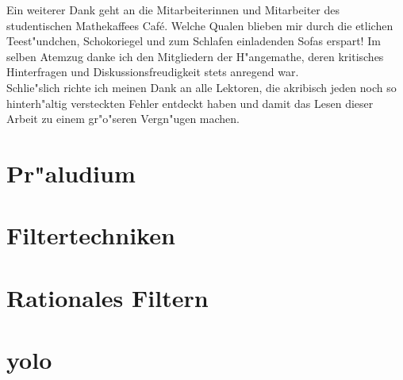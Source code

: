 \documentclass[11pt, twoside]{report} %
\begin{document}
Ein weiterer Dank geht an die Mitarbeiterinnen und Mitarbeiter des studentischen Mathekaffees  Caf\'e\grqq. Welche Qualen blieben mir durch
die etlichen Teest"undchen, Schokoriegel und zum Schlafen einladenden Sofas erspart! Im selben Atemzug
danke ich den Mitgliedern der \glqq H"angemathe\grqq, deren kritisches Hinterfragen und Diskussionsfreudigkeit stets anregend war.\\

Schlie"slich richte ich meinen Dank an alle Lektoren, die akribisch jeden noch so hinterh"altig versteckten
Fehler entdeckt haben und damit das Lesen dieser Arbeit zu einem gr"o"seren Vergn"ugen machen.\\

\tableofcontents

\chapter{Pr"aludium}%


\chapter{Filtertechniken} %


\chapter{Rationales Filtern}%


%

%

\appendix
\chapter{yolo}


\nocite{*}
\printbibliography
\end{document}
